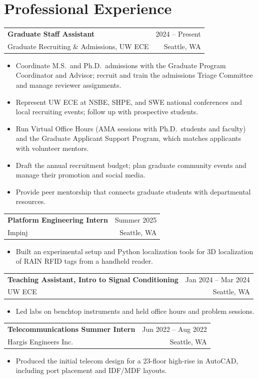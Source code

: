 \documentclass[10pt,letterpaper]{article}
\makeatletter
\newcommand{\job}[4]{%
  \begin{tabularx}{\linewidth}{@{}X r@{}}
    \textbf{#1} & \textcolor{muted}{#2}\\
    \textcolor{accent}{#3} & \textcolor{muted}{\small #4}
  \end{tabularx}\par}
\makeatother
\begin{document}
\section{Professional Experience}
\job{Graduate Staff Assistant}{2024 -- Present}{Graduate Recruiting \& Admissions, UW ECE}{Seattle, WA}
\begin{itemize}
  \item Coordinate M.S.\ and Ph.D.\ admissions with the Graduate Program Coordinator and Advisor; recruit and train the admissions Triage Committee and manage reviewer assignments.
  \item Represent UW ECE at NSBE, SHPE, and SWE national conferences and local recruiting events; follow up with prospective students.
  \item Run Virtual Office Hours (AMA sessions with Ph.D.\ students and faculty) and the Graduate Applicant Support Program, which matches applicants with volunteer mentors.
  \item Draft the annual recruitment budget; plan graduate community events and manage their promotion and social media.
  \item Provide peer mentorship that connects graduate students with departmental resources.
\end{itemize}
\vspace{4pt}
\job{Platform Engineering Intern}{Summer 2025}{Impinj}{Seattle, WA}
\begin{itemize}
  \item Built an experimental setup and Python localization tools for 3D localization of RAIN RFID tags from a handheld reader.
\end{itemize}
\vspace{4pt}
\job{Teaching Assistant, Intro to Signal Conditioning}{Jan 2024 -- Mar 2024}{UW ECE}{Seattle, WA}
\begin{itemize}
  \item Led labs on benchtop instruments and held office hours and problem sessions.
\end{itemize}
\vspace{4pt}
\job{Telecommunications Summer Intern}{Jun 2022 -- Aug 2022}{Hargis Engineers Inc.}{Seattle, WA}
\begin{itemize}
  \item Produced the initial telecom design for a 23-floor high-rise in AutoCAD, including port placement and IDF/MDF layouts.
\end{itemize}

\end{document}
